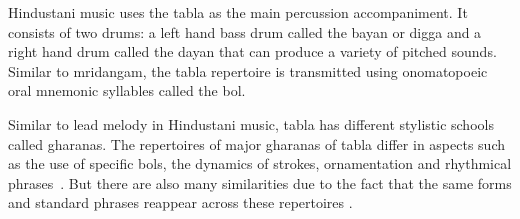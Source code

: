 Hindustani music uses the \gls{tabla} as the main percussion accompaniment. It consists of two drums: a left hand bass drum called the \gls{bayan} or \gls{digga} and a right hand drum called the \gls{dayan} that can produce a variety of pitched sounds. Similar to mridangam, the \gls{tabla} repertoire is transmitted using onomatopoeic oral mnemonic syllables called the \gls{bol}. 

Similar to lead melody in Hindustani music, \gls{tabla} has different stylistic schools called \glspl{gharana}. The repertoires of major \glspl{gharana} of \gls{tabla} differ in aspects such as the use of specific \glspl{bol}, the dynamics of strokes, ornamentation and rhythmical phrases~\cite[p.~60]{beronja:08:tabla}. But there are also many similarities due to the fact that the same forms and standard phrases reappear across these repertoires \cite[p.~52]{gottlieb:93:tabla}. 

